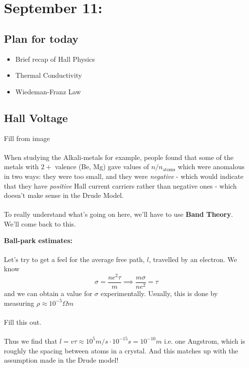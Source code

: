 \documentclass[11pt]{article}
\begin{document}
\section{September 11: }

\subsection*{Plan for today}

\begin{itemize}
  \item Brief recap of Hall Physics
  \item Thermal Conductivity
  \item Wiedeman-Franz Law
\end{itemize}

\subsection*{Hall Voltage}
Fill from image
\\
\\
When studying the Alkali-metals for example, people found that some of the metals with $2+$ valence (Be, Mg) gave values of $n/n_{\text{atoms}}$ which were anomalous in two ways: they were too small, and they were \emph{negative} - which would indicate that they have \emph{positive} Hall current carriers rather than negative ones - which doesn't make sense in the Drude Model.
\\
\\
To really understand what's going on here, we'll have to use \textbf{Band Theory}. We'll come back to this.

\begin{redbox}
  \textbf{Ball-park estimates:}
  \\
  \\
  Let's try to get a feel for the average free path, $l$, travelled by an electron. We know $$ \sigma = \frac{ne^2 \tau }{m} \implies \frac{m\sigma}{ne^2} = \tau $$  
  and we can obtain a value for $\sigma$ experimentally. Usually, this is done by measuring $\rho \approx 10^{-5} \Omega m$
  \\
  \\
  Fill this out.
  \\
  \\
  Thus we find that $l = v\tau \approx 10^5 m/s \cdot 10^{-15} s = 10^{-10} m $ i.e. one Angstrom, which is roughly the spacing between atoms in a crystal. And this matches up with the assumption made in the Drude model!
\end{redbox}
\end{document}
